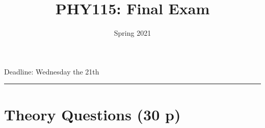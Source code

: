 \documentclass[12pt]{article}
\title{PHY115: Final Exam}
\author{Spring 2021}
\date{}
\newcommand{\blankline}{\quad\pagebreak[2]}
\begin{document}
\maketitle





\begin{center}
 Deadline:  Wednesday the 21th
\end{center}
\hrule



\section*{Theory Questions (30 p)}
\end{document}

